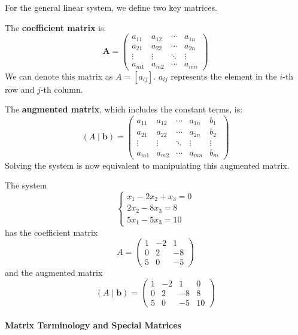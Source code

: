 For the general linear system, we define two key matrices.

The \textbf{coefficient matrix} is:
\[ \textbf{A} = \begin{pmatrix}
a_{11} & a_{12} & \cdots & a_{1n} \\
a_{21} & a_{22} & \cdots & a_{2n} \\
\vdots & \vdots & \ddots & \vdots \\
a_{m1} & a_{m2} & \cdots & a_{mn}
\end{pmatrix} \]
We can denote this matrix as $A = [a_{ij}]$. $a_{ij}$ represents the element in the $i$-th row and $j$-th column.

The \textbf{augmented matrix}, which includes the constant terms, is:
\[ (A \mid \mathbf{b}) = \left(\begin{array}{cccc|c}
a_{11} & a_{12} & \cdots & a_{1n} & b_1 \\
a_{21} & a_{22} & \cdots & a_{2n} & b_2 \\
\vdots & \vdots & \ddots & \vdots & \vdots \\
a_{m1} & a_{m2} & \cdots & a_{mn} & b_m
\end{array}\right) \]
Solving the system is now equivalent to manipulating this augmented matrix.

\begin{example}
The system
\[
\begin{cases}
x_1 - 2x_2 + x_3 = 0 \\
2x_2 - 8x_3 = 8 \\
5x_1 - 5x_3 = 10
\end{cases}
\]
has the coefficient matrix
\[ A = \begin{pmatrix} 1 & -2 & 1 \\ 0 & 2 & -8 \\ 5 & 0 & -5 \end{pmatrix} \]
and the augmented matrix
\[ (A \mid \mathbf{b}) = \left(\begin{array}{ccc|c} 1 & -2 & 1 & 0 \\ 0 & 2 & -8 & 8 \\ 5 & 0 & -5 & 10 \end{array}\right) \]
\end{example}

\paragraph{Matrix Terminology and Special Matrices}

